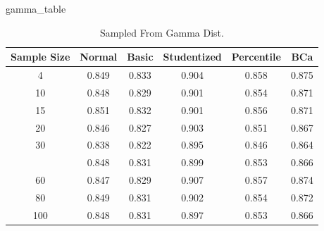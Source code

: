 \documentclass[12pt]{article}
\newenvironment{Shaded}{\begin{snugshade}}{\end{snugshade}}
\newcommand{\NormalTok}[1]{#1}
\begin{document}
\begin{Shaded}
\begin{Highlighting}[]
\NormalTok{gamma\_table}
\end{Highlighting}
\end{Shaded}

\begin{table}

\caption{\label{tab:create graphs}Sampled From Gamma Dist.}
\centering
\begin{tabular}[t]{cccccc}
\toprule
Sample Size & Normal & Basic & Studentized & Percentile & BCa\\
\midrule
4 & 0.849 & 0.833 & 0.904 & 0.858 & 0.875\\
10 & 0.848 & 0.829 & 0.901 & 0.854 & 0.871\\
15 & 0.851 & 0.832 & 0.901 & 0.856 & 0.871\\
20 & 0.846 & 0.827 & 0.903 & 0.851 & 0.867\\
30 & 0.838 & 0.822 & 0.895 & 0.846 & 0.864\\
\addlinespace
40 & 0.848 & 0.831 & 0.899 & 0.853 & 0.866\\
60 & 0.847 & 0.829 & 0.907 & 0.857 & 0.874\\
80 & 0.849 & 0.831 & 0.902 & 0.854 & 0.872\\
100 & 0.848 & 0.831 & 0.897 & 0.853 & 0.866\\
\bottomrule
\end{tabular}
\end{table}
\end{document}
